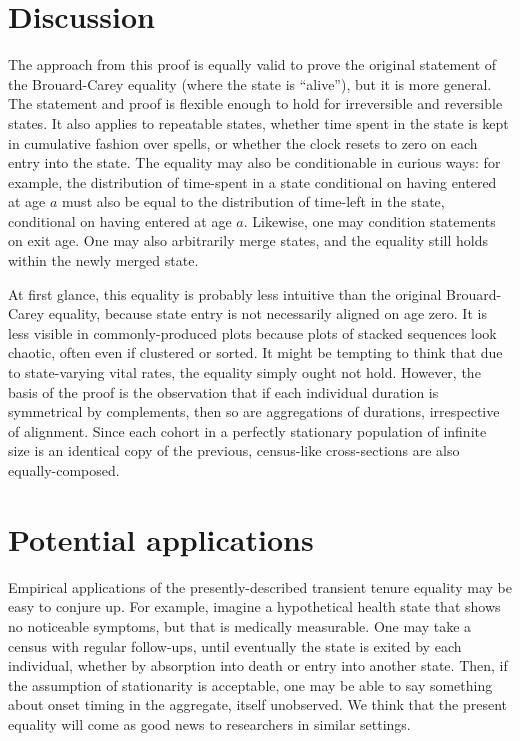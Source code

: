 \documentclass[12pt,oneside,a4paper]{article}
\theoremstyle{definition}
\begin{document}
\section{Discussion}
The approach from this proof is equally valid to prove the
original statement of the Brouard-Carey equality (where the state is ``alive''),
but it is more general.
The statement and proof is flexible enough to hold for irreversible and reversible
states. It also applies to repeatable states, whether time spent in the
state is kept in cumulative fashion over spells, or whether the clock resets to
zero on each entry into the state. The equality may also be conditionable in
curious ways: for example, the distribution of time-spent in a state conditional
on having entered at age $a$ must also be equal to the distribution of time-left in
the state, conditional on having entered at age $a$. Likewise, one may condition
statements on exit age. One may also arbitrarily merge states, and the equality
still holds within the newly merged state.

At first glance, this equality is probably less intuitive than the
original Brouard-Carey equality, because state entry is not necessarily aligned
on age zero. It is less visible in commonly-produced plots because plots of
stacked sequences look chaotic, often even if clustered or sorted. It might
be tempting to think that due to state-varying vital rates, the equality simply ought not hold.
However, the basis of the proof is the observation that if each individual
duration is symmetrical by complements, then so are aggregations of
durations, irrespective of alignment. Since each cohort in a perfectly
stationary population of infinite size is an identical copy of the previous,
census-like cross-sections are also equally-composed.

\section{Potential applications}
Empirical applications of the presently-described transient tenure equality may
be easy to conjure up. For example, imagine a hypothetical health state that
shows no noticeable symptoms, but that is medically measurable. One
may take a census with regular follow-ups, until eventually the state is exited
by each individual, whether by absorption into death or entry into another
state. Then, if the assumption of stationarity is acceptable, one may be able to
say something about onset timing in the aggregate, itself unobserved. We think
that the present equality will come as good news to researchers in similar
settings.
\end{document}
